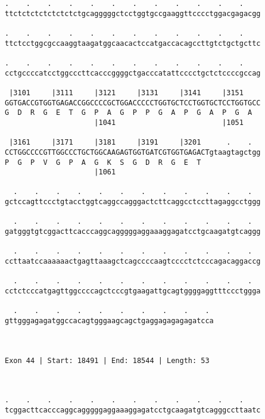 \documentclass{article}
\begin{document}
\begin{Verbatim}
.    .    .    .    .    .    .    .    .    .    .    .    
ttctctctctctctctctgcagggggctcctggtgccgaaggttcccctggacgagacgg
                                                            
.    .    .    .    .    .    .    .    .    .    .    .    
ttctcctggcgccaaggtaagatggcaacactccatgaccacagccttgtctgctgcttc
                                                            
.    .    .    .    .    .    .    .    .    .    .    .    
cctgccccatcctggcccttcacccggggctgacccatattcccctgctctccccgccag
                                                            
 |3101     |3111     |3121     |3131     |3141     |3151    
GGTGACCGTGGTGAGACCGGCCCCGCTGGACCCCCTGGTGCTCCTGGTGCTCCTGGTGCC
G  D  R  G  E  T  G  P  A  G  P  P  G  A  P  G  A  P  G  A  
                     |1041                         |1051    
  
 |3161     |3171     |3181     |3191     |3201      .    .  
CCTGGCCCCGTTGGCCCTGCTGGCAAGAGTGGTGATCGTGGTGAGACTgtaagtagctgg
P  G  P  V  G  P  A  G  K  S  G  D  R  G  E  T              
                     |1061                                  
  
  .    .    .    .    .    .    .    .    .    .    .    .  
gctccagttccctgtacctggtcaggccagggactcttcaggcctccttagaggcctggg
                                                            
  .    .    .    .    .    .    .    .    .    .    .    .  
gatgggtgtcggacttcacccaggcagggggaggaaaggagatcctgcaagatgtcaggg
                                                            
  .    .    .    .    .    .    .    .    .    .    .    .  
ccttaatccaaaaaactgagttaaagctcagccccaagtcccctctcccagacaggaccg
                                                            
  .    .    .    .    .    .    .    .    .    .    .    .  
cctctcccatgagttggccccagctcccgtgaagattgcagtggggaggtttccctggga
                                                            
  .    .    .    .    .    .    .    .    .    . 
gttgggagagatggccacagtgggaagcagctgaggagagagagatcca
                                                 
                                                 
 
Exon 44 | Start: 18491 | End: 18544 | Length: 53



.    .    .    .    .    .    .    .    .    .    .    .    
tcggacttcacccaggcagggggaggaaaggagatcctgcaagatgtcagggccttaatc
                                                            

\end{Verbatim}
\end{document}
